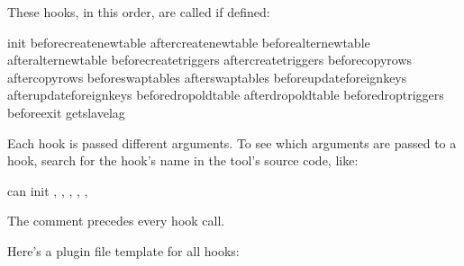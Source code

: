 \documentclass[letterpaper,10pt,english]{sphinxmanual}
\begin{document}
\sphinxAtStartPar
These hooks, in this order, are called if defined:

\begin{sphinxVerbatim}[commandchars=\\\{\}]
init
before\PYGZus{}create\PYGZus{}new\PYGZus{}table
after\PYGZus{}create\PYGZus{}new\PYGZus{}table
before\PYGZus{}alter\PYGZus{}new\PYGZus{}table
after\PYGZus{}alter\PYGZus{}new\PYGZus{}table
before\PYGZus{}create\PYGZus{}triggers
after\PYGZus{}create\PYGZus{}triggers
before\PYGZus{}copy\PYGZus{}rows
after\PYGZus{}copy\PYGZus{}rows
before\PYGZus{}swap\PYGZus{}tables
after\PYGZus{}swap\PYGZus{}tables
before\PYGZus{}update\PYGZus{}foreign\PYGZus{}keys
after\PYGZus{}update\PYGZus{}foreign\PYGZus{}keys
before\PYGZus{}drop\PYGZus{}old\PYGZus{}table
after\PYGZus{}drop\PYGZus{}old\PYGZus{}table
before\PYGZus{}drop\PYGZus{}triggers
before\PYGZus{}exit
get\PYGZus{}slave\PYGZus{}lag
\end{sphinxVerbatim}

\sphinxAtStartPar
Each hook is passed different arguments.  To see which arguments are passed
to a hook, search for the hook’s name in the tool’s source code, like:

\begin{sphinxVerbatim}[commandchars=\\\{\}]
    \PYGZhy{}\PYGZgt{}can  
   \PYGZhy{}\PYGZgt{}init
             \PYGZgt{} ,
         \PYGZgt{} ,
         \PYGZgt{} ,
               \PYGZgt{} ,
       \PYGZgt{} ,
\end{sphinxVerbatim}

\sphinxAtStartPar
The comment  precedes every hook call.

\sphinxAtStartPar
Here’s a plugin file template for all hooks:
\end{document}
